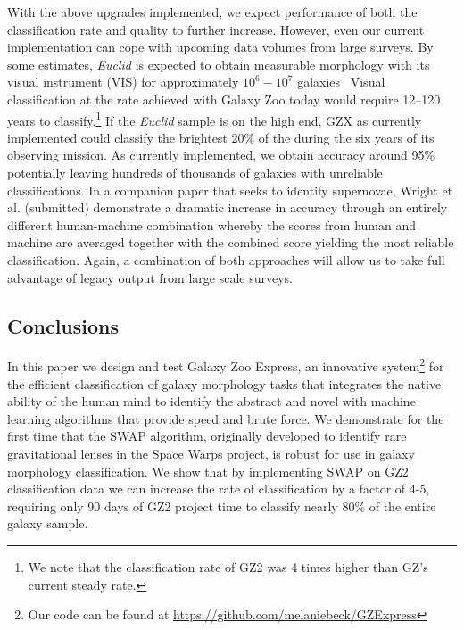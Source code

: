 \documentclass[twocolumn]{aastex6}
\begin{document}
With the above upgrades implemented, we expect performance of both the
classification rate and quality to further increase. However, even our current 
implementation can cope with upcoming data volumes from large surveys. 
By some estimates, \textit{Euclid} is expected to obtain measurable morphology with its 
visual instrument (VIS) for approximately $10^6 - 10^7$ galaxies~\citep{Euclid}
Visual classification at the rate achieved with Galaxy Zoo today
would require 12--120 years to classify.\footnote{We note that the classification 
rate of GZ2 was 4 times higher than GZ's current steady rate.}
If the \textit{Euclid} sample is on the high end, GZX as currently implemented
could classify the brightest 20\% of the during the six years of its observing mission. 
As currently implemented, we obtain accuracy around 95\% potentially leaving
hundreds of thousands of galaxies with unreliable classifications.  
In a companion paper that seeks to identify supernovae, Wright et al. (submitted) 
demonstrate a dramatic increase in accuracy through an entirely different human-machine 
combination whereby the
scores from human and machine are averaged together with the combined score 
yielding the most reliable classification. Again, a combination of both 
approaches will allow us to take full advantage of legacy output from large scale surveys.


\subsection{Conclusions}

In this paper we design and test Galaxy Zoo Express, an innovative system\footnote{Our code can be found at \url{https://github.com/melaniebeck/GZExpress}} 
for the efficient classification of galaxy morphology tasks that integrates the 
native ability of the human mind to identify the abstract and novel with 
machine learning algorithms that provide speed and brute force.  
We demonstrate for the first time that the 
SWAP algorithm, originally developed to identify rare gravitational lenses in the 
Space Warps project, is robust for use in galaxy morphology classification. 
We show that by implementing
SWAP on GZ2 classification data we can increase the rate of classification by a factor
of 4-5, requiring only 90 days of GZ2 project time to classify nearly 80\% of the
entire galaxy sample. 
\end{document}
